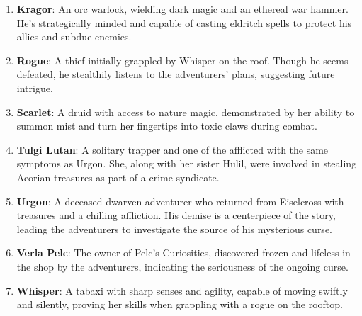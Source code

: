 \documentclass[
  12pt,twoside,twocolumn,openany,nodeprecatedcode]{dndbook}
\begin{document}
\begin{enumerate}
  longship \emph{Frostwind} that brought the adventurers to Palebank
  Village. His demeanor is quiet, and he is experienced with sailing
  through icy waters.
\item
  \textbf{Kragor}: An orc warlock, wielding dark magic and an ethereal
  war hammer. He's strategically minded and capable of casting eldritch
  spells to protect his allies and subdue enemies.
\item
  \textbf{Rogue}: A thief initially grappled by Whisper on the roof.
  Though he seems defeated, he stealthily listens to the adventurers'
  plans, suggesting future intrigue.
\item
  \textbf{Scarlet}: A druid with access to nature magic, demonstrated by
  her ability to summon mist and turn her fingertips into toxic claws
  during combat.
\item
  \textbf{Tulgi Lutan}: A solitary trapper and one of the afflicted with
  the same symptoms as Urgon. She, along with her sister Hulil, were
  involved in stealing Aeorian treasures as part of a crime syndicate.
\item
  \textbf{Urgon}: A deceased dwarven adventurer who returned from
  Eiselcross with treasures and a chilling affliction. His demise is a
  centerpiece of the story, leading the adventurers to investigate the
  source of his mysterious curse.
\item
  \textbf{Verla Pelc}: The owner of Pelc's Curiosities, discovered
  frozen and lifeless in the shop by the adventurers, indicating the
  seriousness of the ongoing curse.
\item
  \textbf{Whisper}: A tabaxi with sharp senses and agility, capable of
  moving swiftly and silently, proving her skills when grappling with a
  rogue on the rooftop.
\end{enumerate}
\end{document}
